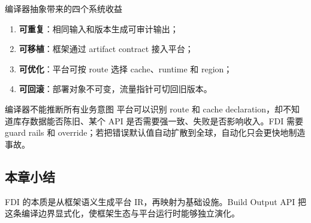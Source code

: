 \begin{importantbox}{编译器抽象带来的四个系统收益}
\begin{enumerate}
  \item \textbf{可重复}：相同输入和版本生成可审计输出；
  \item \textbf{可移植}：框架通过 artifact contract 接入平台；
  \item \textbf{可优化}：平台可按 route 选择 cache、runtime 和 region；
  \item \textbf{可回滚}：部署对象不可变，流量指针可切回旧版本。
\end{enumerate}
\end{importantbox}

\begin{warningbox}{编译器不能推断所有业务意图}
平台可以识别 route 和 cache declaration，却不知道库存数据能否陈旧、某个 API 是否需要强一致、失败是否影响收入。FDI 需要 guard rails 和 override；若把错误默认值自动扩散到全球，自动化只会更快地制造事故。
\end{warningbox}

\subsection{本章小结}

FDI 的本质是从框架语义生成平台 IR，再映射为基础设施。Build Output API 把这条编译边界显式化，使框架生态与平台运行时能够独立演化。

